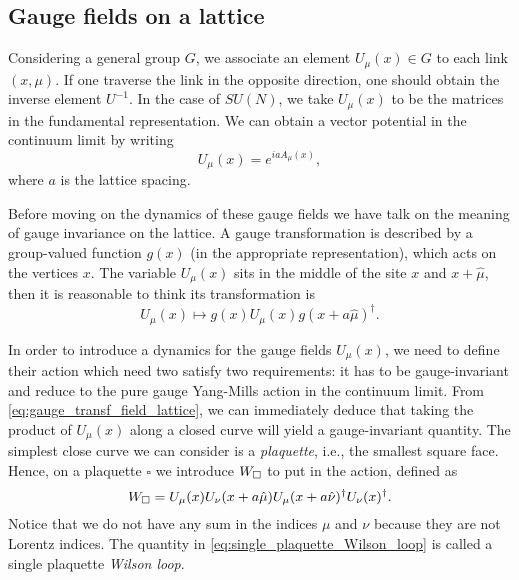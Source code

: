 %
%
\subsection{Gauge fields on a lattice}
\label{sub:gauge_fields_on_a_lattice}

Considering a general group $G$, we associate an element $U_{\mu}(x) \in G$ to each link $(x, \mu)$.
If one traverse the link in the opposite direction, one should obtain the inverse element $U^{-1}$.
In the case of $SU(N)$, we take $U_{\mu}(x)$ to be the matrices in the fundamental representation.
We can obtain a vector potential in the continuum limit by writing
\begin{equation}
    U_{\mu}(x) = e^{i a A_{\mu}(x)},
\end{equation}
where $a$ is the lattice spacing.

Before moving on the dynamics of these gauge fields we have talk on the meaning of gauge invariance on the lattice.
A gauge transformation is described by a group-valued function $g(x)$ (in the appropriate representation), which acts on the vertices $x$.
The variable $U_{\mu}(x)$ sits in the middle of the site $x$ and $x + \hat{\mu}$, then it is reasonable to think its transformation is
\begin{equation}
    U_{\mu}(x) \mapsto g(x) U_{\mu}(x) g(x + a \hat{\mu})^{\dagger}.
    \label{eq:gauge_transf_field_lattice}
\end{equation}

In order to introduce a dynamics for the gauge fields $U_{\mu}(x)$, we need to define their action which need two satisfy two requirements:
it has to be gauge-invariant and reduce to the pure gauge Yang-Mills action in the continuum limit.
From \eqref{eq:gauge_transf_field_lattice}, we can immediately deduce that taking the product of $U_{\mu}(x)$ along a closed curve will yield a gauge-invariant quantity.
The simplest close curve we can consider is a \emph{plaquette}, i.e., the smallest square face.
Hence, on a plaquette $\square$ we introduce $W_{\square}$ to put in the action, defined as
\begin{equation}
    W_{\square} =
    U_{\mu}(x) U_{\nu}(x + a \hat{\mu}) U_{\mu}(x + a \hat{\nu})^{\dagger} U_{\nu}(x)^{\dagger}.
    \label{eq:single_plaquette_Wilson_loop}
\end{equation}
Notice that we do not have any sum in the indices $\mu$ and $\nu$ because they are not Lorentz indices.
The quantity in \eqref{eq:single_plaquette_Wilson_loop} is called a single plaquette \emph{Wilson loop}.

